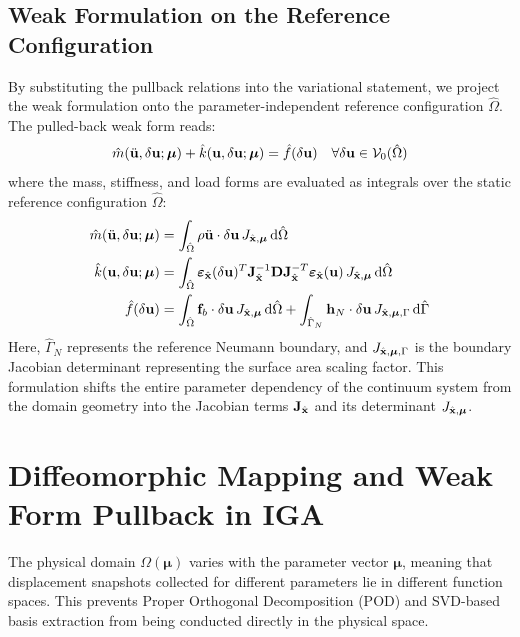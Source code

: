 \subsection{Weak Formulation on the Reference Configuration}
By substituting the pullback relations into the variational statement, we project the weak formulation onto the parameter-independent reference configuration $\hat{\Omega}$. The pulled-back weak form reads:
\begin{equation}
    \hat{m}(\ddot{\mathbf{u}}, \delta\mathbf{u}; \boldsymbol{\mu}) + \hat{k}(\mathbf{u}, \delta\mathbf{u}; \boldsymbol{\mu}) = \hat{f}(\delta\mathbf{u}) \quad \forall \delta\mathbf{u} \in \mathcal{V}_0(\hat{\Omega})
\end{equation}
where the mass, stiffness, and load forms are evaluated as integrals over the static reference configuration $\hat{\Omega}$:
\begin{align}
    \hat{m}(\ddot{\mathbf{u}}, \delta\mathbf{u}; \boldsymbol{\mu}) & = \int_{\hat{\Omega}} \rho \ddot{\mathbf{u}} \cdot \delta\mathbf{u} \, J_{\hat{\mathbf{x}}, \boldsymbol{\mu}} \, \mathrm{d}\hat{\Omega}                                                                                                                                                 \\
    \hat{k}(\mathbf{u}, \delta\mathbf{u}; \boldsymbol{\mu})        & = \int_{\hat{\Omega}} \boldsymbol{\varepsilon}_{\hat{\mathbf{x}}}(\delta\mathbf{u})^T \mathbf{J}_{\hat{\mathbf{x}}}^{-1} \mathbf{D} \mathbf{J}_{\hat{\mathbf{x}}}^{-T} \boldsymbol{\varepsilon}_{\hat{\mathbf{x}}}(\mathbf{u}) \, J_{\hat{\mathbf{x}}, \boldsymbol{\mu}} \, \mathrm{d}\hat{\Omega} \\
    \hat{f}(\delta\mathbf{u})                                    & = \int_{\hat{\Omega}} \mathbf{f}_b \cdot \delta\mathbf{u} \, J_{\hat{\mathbf{x}}, \boldsymbol{\mu}} \, \mathrm{d}\hat{\Omega} + \int_{\hat{\Gamma}_N} \mathbf{h}_N \cdot \delta\mathbf{u} \, J_{\hat{\mathbf{x}}, \boldsymbol{\mu}, \Gamma} \, \mathrm{d}\hat{\Gamma}
\end{align}
Here, $\hat{\Gamma}_N$ represents the reference Neumann boundary, and $J_{\hat{\mathbf{x}}, \boldsymbol{\mu}, \Gamma}$ is the boundary Jacobian determinant representing the surface area scaling factor. This formulation shifts the entire parameter dependency of the continuum system from the domain geometry into the Jacobian terms $\mathbf{J}_{\hat{\mathbf{x}}}$ and its determinant $J_{\hat{\mathbf{x}}, \boldsymbol{\mu}}$.


\section{Diffeomorphic Mapping and Weak Form Pullback in IGA}
The physical domain $\Omega(\boldsymbol{\mu})$ varies with the parameter vector $\boldsymbol{\mu}$, meaning that displacement snapshots collected for different parameters lie in different function spaces. This prevents Proper Orthogonal Decomposition (POD) and SVD-based basis extraction from being conducted directly in the physical space.

